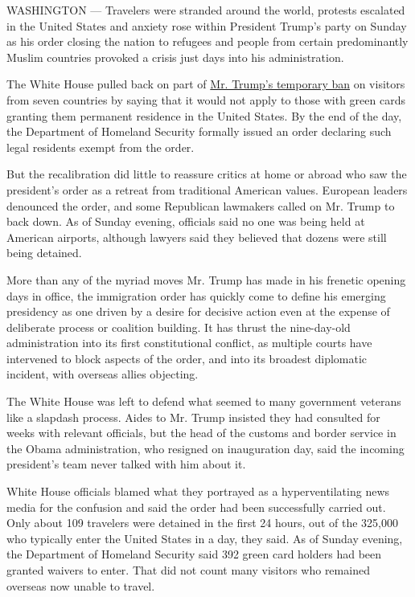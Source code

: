 WASHINGTON --- Travelers were stranded around the world, protests
escalated in the United States and anxiety rose within President Trump's
party on Sunday as his order closing the nation to refugees and people
from certain predominantly Muslim countries provoked a crisis just days
into his administration.

The White House pulled back on part of
\href{https://www.nytimes.com/2017/01/28/us/refugees-detained-at-us-airports-prompting-legal-challenges-to-trumps-immigration-order.html?_r=0}{Mr.
Trump's temporary ban} on visitors from seven countries by saying that
it would not apply to those with green cards granting them permanent
residence in the United States. By the end of the day, the Department of
Homeland Security formally issued an order declaring such legal
residents exempt from the order.

But the recalibration did little to reassure critics at home or abroad
who saw the president's order as a retreat from traditional American
values. European leaders denounced the order, and some Republican
lawmakers called on Mr. Trump to back down. As of Sunday evening,
officials said no one was being held at American airports, although
lawyers said they believed that dozens were still being detained.

More than any of the myriad moves Mr. Trump has made in his frenetic
opening days in office, the immigration order has quickly come to define
his emerging presidency as one driven by a desire for decisive action
even at the expense of deliberate process or coalition building. It has
thrust the nine-day-old administration into its first constitutional
conflict, as multiple courts have intervened to block aspects of the
order, and into its broadest diplomatic incident, with overseas allies
objecting.

The White House was left to defend what seemed to many government
veterans like a slapdash process. Aides to Mr. Trump insisted they had
consulted for weeks with relevant officials, but the head of the customs
and border service in the Obama administration, who resigned on
inauguration day, said the incoming president's team never talked with
him about it.

White House officials blamed what they portrayed as a hyperventilating
news media for the confusion and said the order had been successfully
carried out. Only about 109 travelers were detained in the first 24
hours, out of the 325,000 who typically enter the United States in a
day, they said. As of Sunday evening, the Department of Homeland
Security said 392 green card holders had been granted waivers to enter.
That did not count many visitors who remained overseas now unable to
travel.

